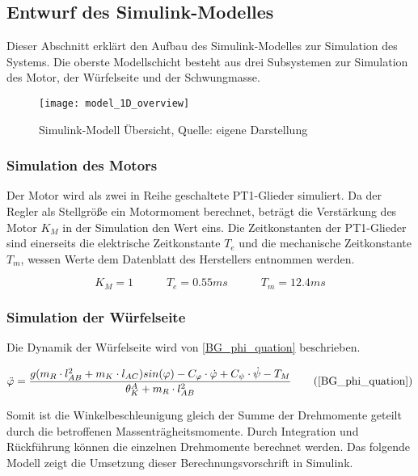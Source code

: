 \newpage
\subsection{Entwurf des Simulink-Modelles}
Dieser Abschnitt erklärt den Aufbau des Simulink-Modelles zur Simulation des Systems. Die oberste Modellschicht besteht aus drei Subsystemen zur Simulation des Motor, der Würfelseite und der Schwungmasse.

\begin{figure}[h]
\label{Simulink_1DModell_Overview}
\texttt{[image: model\_1D\_overview]}
\caption{Simulink-Modell Übersicht, Quelle: eigene Darstellung}
\end{figure}

\subsubsection{Simulation des Motors}
Der Motor wird als zwei in Reihe geschaltete PT1-Glieder simuliert. Da der Regler als Stellgröße ein Motormoment berechnet, beträgt die Verstärkung des Motor $K_M$ in der Simulation den Wert eins. Die Zeitkonstanten der PT1-Glieder sind einerseits die elektrische Zeitkonstante $T_e$ und die mechanische Zeitkonstante $T_m$, wessen Werte dem Datenblatt des Herstellers entnommen werden.

\begin{equation}
K_M = 1 \hspace{35pt} T_e = 0.55ms \hspace{35pt} T_m = 12.4ms
\end{equation}

\subsubsection{Simulation der Würfelseite}
Die Dynamik der Würfelseite wird von \ref{BG_phi_quation} beschrieben.

\begin{equation}
\ddot{\varphi} = \frac{g(m_R \cdot l_{AB}^2 + m_K \cdot l_{AC})sin(\varphi) - C_{\varphi} \cdot \dot{\varphi} + C_{\psi} \cdot \dot{\psi} - T_M}{{\theta}^A_K + m_R \cdot l_{AB}^2} \tag{\ref{BG_phi_quation}}
\end{equation}

Somit ist die Winkelbeschleunigung gleich der Summe der Drehmomente geteilt durch die betroffenen Massenträgheitsmomente. Durch Integration und Rückführung können die einzelnen Drehmomente berechnet werden. Das folgende Modell zeigt die Umsetzung dieser Berechnungsvorschrift in Simulink.

